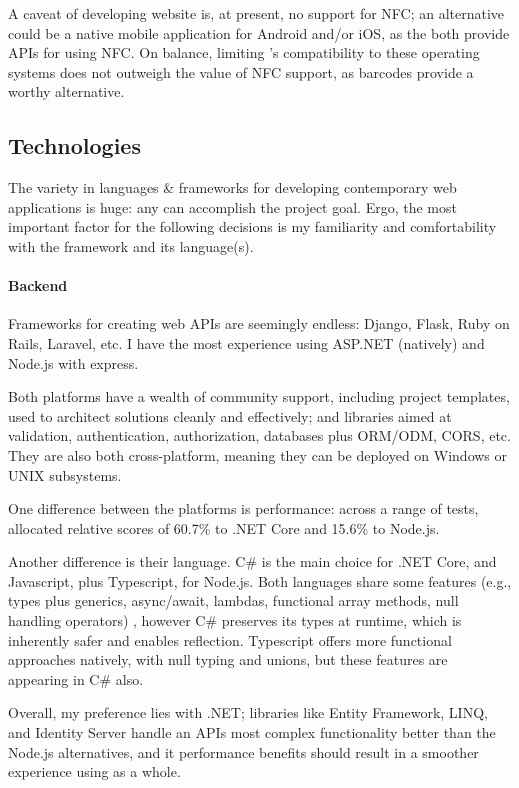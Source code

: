 A caveat of developing website is, at present, no support
for NFC; an alternative could be a native mobile
application for Android and/or iOS, as the both provide
APIs for using NFC.
On balance, limiting \projectname{}'s compatibility to
these operating systems does not outweigh the value of NFC
support, as barcodes provide a worthy alternative.

\subsection{Technologies}

The variety in languages \& frameworks for developing
contemporary web applications is huge: any can accomplish
the project goal.
Ergo, the most important factor for the following decisions
is my familiarity and comfortability with the framework and
its language(s).

\paragraph{Backend}

Frameworks for creating web APIs are seemingly endless:
Django, Flask, Ruby on Rails, Laravel, etc. I have the most
experience using ASP.NET (natively) and Node.js with
express.

Both platforms have a wealth of community support,
including project templates, used to architect solutions
cleanly and effectively; and libraries aimed at validation,
authentication, authorization, databases plus ORM/ODM,
CORS, etc. They are also both cross-platform, meaning they
can be deployed on Windows or UNIX subsystems.

One difference between the platforms is performance: across
a range of tests, \cite{webFrameworkBenchmarks} allocated
relative scores of 60.7\% to .NET Core and 15.6\% to
Node.js.

Another difference is their language.
C\# is the main choice for .NET Core, and Javascript, plus
Typescript, for Node.js.
Both languages share some features (e.g., types plus
generics, async/await, lambdas, functional array methods,
null handling operators) \parencite{csharp,ts}, however C\#
preserves its types at runtime, which is inherently safer
and enables reflection.
Typescript offers more functional approaches natively, with
null typing and unions, but these features are appearing in
C\# also.

Overall, my preference lies with .NET; libraries like
Entity Framework, LINQ, and Identity Server handle an APIs
most complex functionality better than the Node.js
alternatives, and it performance benefits should result in
a smoother experience using \projectname{} as a whole.

